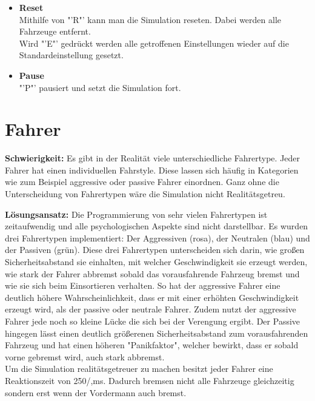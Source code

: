 \begin{addmargin}[25pt]{0pt}
\begin{itemize}
		\item \textbf{Reset}\\
		Mithilfe von "'R"' kann man die Simulation reseten. Dabei werden alle Fahrzeuge entfernt.\\
		Wird "'E"' gedrückt werden alle getroffenen Einstellungen wieder auf die Standardeinstellung gesetzt.
		\item \textbf{Pause}\\
		"'P"' pausiert und setzt die Simulation fort.
	\end{itemize}
\end{addmargin}

\section{Fahrer}
\textbf{Schwierigkeit:} Es gibt in der Realität viele unterschiedliche Fahrertype. Jeder Fahrer hat einen individuellen Fahrstyle. Diese lassen sich häufig in Kategorien wie zum Beispiel aggressive oder passive Fahrer einordnen. Ganz ohne die Unterscheidung von Fahrertypen wäre die Simulation nicht Realitätsgetreu.
\begin{addmargin}[25pt]{0pt}
	\item \textbf{Lösungsansatz:} Die Programmierung von sehr vielen Fahrertypen ist zeitaufwendig und alle psychologischen Aspekte sind nicht darstellbar. Es wurden drei Fahrertypen implementiert: Der Aggressiven (rosa), der Neutralen (blau) und der Passiven (grün). Diese drei Fahrertypen unterscheiden sich darin, wie großen Sicherheitsabstand sie einhalten, mit welcher Geschwindigkeit sie erzeugt werden, wie stark der Fahrer abbremst sobald das vorausfahrende Fahrzeug bremst und wie sie sich beim Einsortieren verhalten. So hat der aggressive Fahrer eine deutlich höhere Wahrscheinlichkeit, dass er mit einer erhöhten Geschwindigkeit erzeugt wird, als der passive oder neutrale Fahrer. Zudem nutzt der aggressive Fahrer jede noch so kleine Lücke die sich bei der Verengung ergibt. Der Passive hingegen lässt einen deutlich größerenen Sicherheitsabstand zum vorausfahrenden Fahrzeug und hat einen höheren "Panikfaktor", welcher bewirkt, dass er sobald vorne gebremst wird, auch stark abbremst.\\
Um die Simulation realitätsgetreuer zu machen besitzt jeder Fahrer eine Reaktionszeit von 250/,ms. Dadurch bremsen nicht alle Fahrzeuge gleichzeitig sondern erst wenn der Vordermann auch bremst.\\
\end{addmargin}